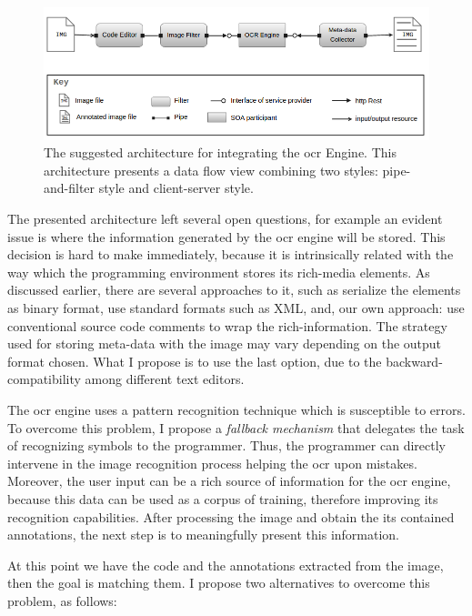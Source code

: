 \begin{figure}[!h]
  \centering
  \includegraphics[width=.7\textwidth]{images/sc-tool-architecture}
    \caption{The suggested architecture for integrating the \gls{ocr} Engine. This architecture presents a data flow view combining two styles: pipe-and-filter style and client-server style.}
  \label{fig:sc-tool-arch}
\end{figure}

The presented architecture left several open questions, for example an evident issue is where the information generated by the \gls{ocr} engine will be stored. This decision is hard to make immediately, because it is intrinsically related with the way which the programming environment stores its rich-media elements. As discussed earlier, there are several approaches to it, such as serialize the elements as binary format, use standard formats such as XML, and, our own approach: use conventional source code comments to wrap the rich-information. The strategy used for storing meta-data with the image may vary depending on the output format chosen. What I propose is to use the last option, due to the backward-compatibility among different text editors.

The \gls{ocr} engine uses a pattern recognition technique which is susceptible to errors. To overcome this problem, I propose a \textit{fallback mechanism} that delegates the task of recognizing symbols to the programmer. Thus, the programmer can directly intervene in the image recognition process helping the \gls{ocr} upon mistakes. Moreover, the user input can be a rich source of information for the \gls{ocr} engine, because this data can be used as a corpus of training, therefore improving its recognition capabilities. After processing the image and obtain the its contained annotations, the next step is to meaningfully present this information.

At this point we have the code and the annotations extracted from the image, then the goal is matching them. I propose two alternatives to overcome this problem, as follows:

